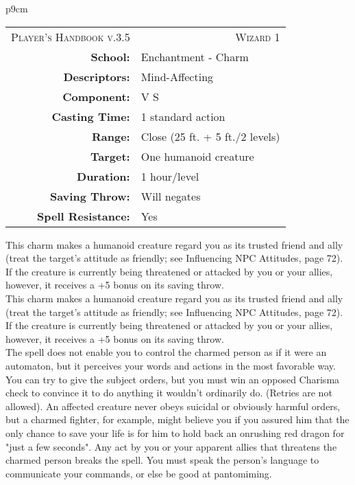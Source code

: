 \documentclass[table,10pt,a4paper,twocolumn]{book}
\begin{document}
\begin{supertabular}{p{9cm}}
  \begin{center}
  \begin{tabular}{rl}
    \multicolumn{1}{l}{
      \scshape\footnotesize{Player's Handbook v.3.5}
    } & 
    \multicolumn{1}{r}{
      \scshape\footnotesize{Wizard 1}
    }\\
    \rule{0pt}{4ex} 
    \textbf{School:} & Enchantment - Charm \\
    \textbf{Descriptors:} & Mind-Affecting \\
    \textbf{Component:} & V S\\
    \textbf{Casting Time:} & 1 standard action \\
    \textbf{Range:} & Close (25 ft. + 5 ft./2 levels) \\
    \textbf{Target:} & One humanoid creature \\
    \textbf{Duration:} & 1 hour/level \\
    \textbf{Saving Throw:} & Will negates \\
    \textbf{Spell Resistance:} & Yes \\
  \end{tabular}
  \end{center}
  This charm makes a humanoid creature regard you as its trusted friend and ally (treat the target's attitude as friendly; see Influencing NPC Attitudes, page 72). If the creature is currently being threatened or attacked by you or your allies, however, it receives a +5 bonus on its saving throw.\\
  This charm makes a humanoid creature regard you as its trusted friend and ally (treat the target's attitude as friendly; see Influencing NPC Attitudes, page 72). If the creature is currently being threatened or attacked by you or your allies, however, it receives a +5 bonus on its saving throw.\\
The spell does not enable you to control the charmed person as if it were an automaton, but it perceives your words and actions in the most favorable way. You can try to give the subject orders, but you must win an opposed Charisma check to convince it to do anything it wouldn't ordinarily do. (Retries are not allowed). An affected creature never obeys suicidal or obviously harmful orders, but a charmed fighter, for example, might believe you if you assured him that the only chance to save your life is for him to hold back an onrushing red dragon for "just a few seconds". Any act by you or your apparent allies that threatens the charmed person breaks the spell. You must speak the person's language to communicate your commands, or else be good at pantomiming.\\

\end{supertabular}
\end{document}
